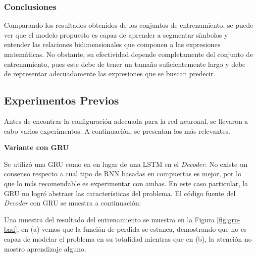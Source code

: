 \subsubsection{Conclusiones}

Comparando los resultados obtenidos de los conjuntos de entrenamiento, se puede ver que el modelo propuesto es capaz de aprender a segmentar símbolos y entender las relaciones bidimensionales que componen a las expresiones matemáticas. No obstante, su efectividad depende completamente del conjunto de entrenamiento, pues este debe de tener un tamaño suficientemente largo y debe de representar adecuadamente las expresiones que se buscan predecir.


\subsection{Experimentos Previos}

Antes de encontrar la configuración adecuada para la red neuronal, se llevaron a cabo varios experimentos. A continuación, se presentan los más relevantes.

\vspace{1em}
\textbf{Variante con GRU}
\vspace{1em}

Se utilizó una GRU como en \cite{gru} en lugar de una LSTM en el \textit{Decoder}. No existe un consenso respecto a cual tipo de RNN basadas en compuertas es mejor, por lo que lo más recomendable es experimentar con ambas. En este caso particular, la GRU no logró abstraer las características del problema. El código fuente del \textit{Decoder} con GRU se muestra a continuación:



Una muestra del resultado del entrenamiento se muestra en la Figura \ref{fig:gru-bad}, en (a) vemos que la función de perdida se estanca, demostrando que no es capaz de modelar el problema en su totalidad mientras que en (b), la atención no mostro aprendizaje alguno.

